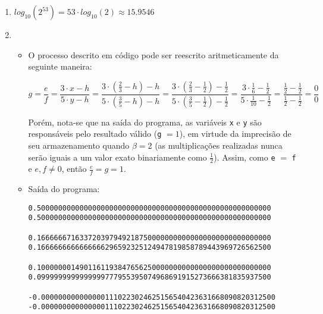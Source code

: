 \documentclass{article}
\newenvironment{arabenum}{
    \begin{enumerate}[label=\textbf{\arabic*})]
}{
    \end{enumerate}
}
\newenvironment{discusscode}[1]{
    
    \vspace{-2mm}
    \begin{itemize}
}{
    \end{itemize}
}
\begin{document}
\begin{arabenum}
\begin{verbatim}
>>> 2**(-1022 - 52)
5e-324
>>> 2**(-1022)
2.2250738585072014e-308
>>> (2 - 2**(-52)) * (2**1023)
1.7976931348623157e+308
>>> float(2**1024)
Traceback (most recent call last):
  File "<stdin>", line 1, in <module>
OverflowError: int too large to convert to float
\end{verbatim}

\item $log_{10} (2^{53}) = 53 \cdot log_{10} (2) \approx \boldsymbol{15.9546}$

\item \begin{discusscode}{div_by_zero.py}

\item O processo descrito em código pode ser reescrito aritmeticamente da
seguinte maneira:

\begin{equation*}
g = \frac{e}{f}
  = \frac{3 \cdot x - h}{5 \cdot y - h}
  = \frac{3 \cdot (\frac{2}{3} - h) - h}{5 \cdot (\frac{3}{5} - h) - h}
  = \frac{3 \cdot (\frac{2}{3} - \frac{1}{2}) - \frac{1}{2}}
         {5 \cdot (\frac{3}{5} - \frac{1}{2}) - \frac{1}{2}}
  = \frac{3 \cdot \frac{1}{6} - \frac{1}{2}}
         {5 \cdot \frac{1}{10} - \frac{1}{2}}
  = \frac{\frac{1}{2} - \frac{1}{2}}{\frac{1}{2} - \frac{1}{2}}
  = \frac{0}{0}
\end{equation*}

Porém, nota-se que na saída do programa, as variáveis \verb!x! e \verb!y! são
responsáveis pelo resultado válido (\verb!g! $= 1$), em virtude da imprecisão de
seu armazenamento quando $\beta = 2$ (as multiplicações realizadas nunca serão
iguais a um valor exato binariamente como $\frac{1}{2}$). Assim, como \verb!e!
$=$ \verb!f! e $e,f \neq 0$, então $\frac{e}{f} = g = 1$.

\item Saída do programa:
\begin{verbatim}
0.5000000000000000000000000000000000000000000000000000000
0.5000000000000000000000000000000000000000000000000000000

0.1666666716337203979492187500000000000000000000000000000
0.1666666666666666296592325124947819858789443969726562500

0.1000000014901161193847656250000000000000000000000000000
0.0999999999999999777955395074968691915273666381835937500

-0.0000000000000001110223024625156540423631668090820312500
-0.0000000000000001110223024625156540423631668090820312500


\end{verbatim}
\end{discusscode}
\end{arabenum}
\end{document}
